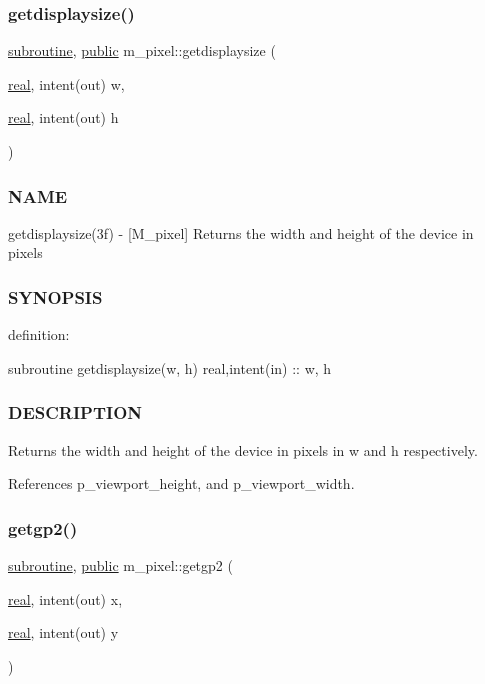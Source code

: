 \subsubsection{\texorpdfstring{getdisplaysize()}{getdisplaysize()}}
{\footnotesize\ttfamily \hyperlink{M__stopwatch_83_8txt_acfbcff50169d691ff02d4a123ed70482}{subroutine}, \hyperlink{M__stopwatch_83_8txt_a2f74811300c361e53b430611a7d1769f}{public} m\+\_\+pixel\+::getdisplaysize (\begin{DoxyParamCaption}\item[{\hyperlink{read__watch_83_8txt_abdb62bde002f38ef75f810d3a905a823}{real}, intent(out)}]{w,  }\item[{\hyperlink{read__watch_83_8txt_abdb62bde002f38ef75f810d3a905a823}{real}, intent(out)}]{h }\end{DoxyParamCaption})}



\subsubsection*{N\+A\+ME}

getdisplaysize(3f) -\/ \mbox{[}M\+\_\+pixel\mbox{]} Returns the width and height of the device in pixels 

\subsubsection*{S\+Y\+N\+O\+P\+S\+IS}

definition\+:

subroutine getdisplaysize(w, h) real,intent(in) \+:\+: w, h

\subsubsection*{D\+E\+S\+C\+R\+I\+P\+T\+I\+ON}

Returns the width and height of the device in pixels in w and h respectively. 

References p\+\_\+viewport\+\_\+height, and p\+\_\+viewport\+\_\+width.

\mbox{\label{namespacem__pixel_a626d769d3dae0c292e3ef1617ad43efb}} 
\subsubsection{\texorpdfstring{getgp2()}{getgp2()}}
{\footnotesize\ttfamily \hyperlink{M__stopwatch_83_8txt_acfbcff50169d691ff02d4a123ed70482}{subroutine}, \hyperlink{M__stopwatch_83_8txt_a2f74811300c361e53b430611a7d1769f}{public} m\+\_\+pixel\+::getgp2 (\begin{DoxyParamCaption}\item[{\hyperlink{read__watch_83_8txt_abdb62bde002f38ef75f810d3a905a823}{real}, intent(out)}]{x,  }\item[{\hyperlink{read__watch_83_8txt_abdb62bde002f38ef75f810d3a905a823}{real}, intent(out)}]{y }\end{DoxyParamCaption})}




